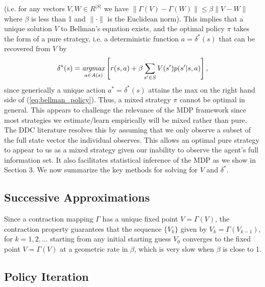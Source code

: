 (i.e. for any vectors $V,W \in R^{|S|}$ we have $\|\Gamma(V)-\Gamma(W)\| \le \beta \|V-W\|$ where $\beta$ is less than 1
and $\|\cdot\|$ is the Euclidean norm). This implies that a  unique solution $V$ to Bellman's equation exists, 
and the optimal policy $\pi$ takes the form of a pure strategy, i.e. a deterministic function $a=\delta^*(s)$
that can be recovered from $V$ by
\begin{equation}
       \delta^*(s) = \mathop{\it argmax}_{a \in A(s)}\left[ r(s,a)+\beta \sum_{s' \in S} V(s')p(s'|s,a)\right],
\label{eq:bellman_policy}
\end{equation}
since generically a unique action $a^*=\delta^*(s)$ attains the max on the right hand side of (\ref{eq:bellman_policy}).
Thus, a mixed strategy $\pi$ cannot be optimal in general. This appears to challenge the relevance of the MDP
framework since most strategies we estimate/learn empirically will be mixed rather than pure. 
The DDC literature resolves this by assuming that  
we only observe a subset of the full state vector the individual observes. This allows an optimal
pure strategy to appear to us as a mixed strategy given our inability to observe the agent's full information set. 
It also facilitates statistical inference of the MDP as we show in Section 3.
We now summarize the key methods for solving for  $V$ and $\delta^*$.


\subsection{Successive Approximations}

Since a contraction mapping $\Gamma$ has a unique fixed point $V=\Gamma(V)$, the contraction property guarantees that 
the sequence $\{V_k\}$ given by $V_k=\Gamma(V_{k-1})$, for $k=1,2,\ldots$ starting from
any initial starting guess $V_0$ converges to the fixed point $V=\Gamma(V)$ at a geometric rate in $\beta$,
which is very slow when $\beta$ is close to 1. 

\subsection{Policy Iteration}
\label{section:pi}

